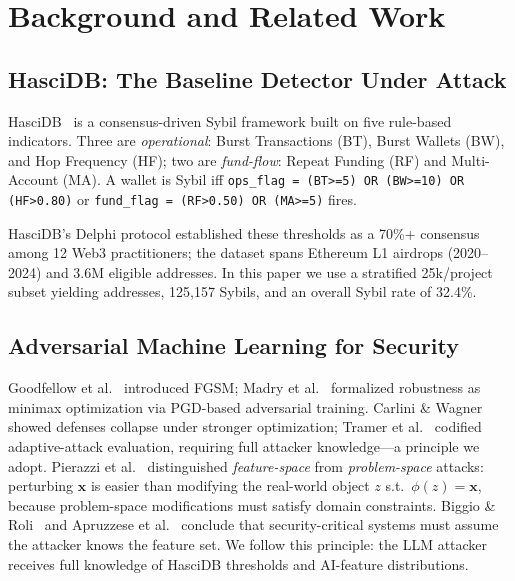 \documentclass[sigconf,nonacm=false]{acmart}
\begin{document}


\section{Background and Related Work}
\label{sec:background}

\subsection{HasciDB: The Baseline Detector Under Attack}

HasciDB~\cite{hascidb2026} is a consensus-driven Sybil framework built on five rule-based indicators. Three are \textit{operational}: Burst Transactions (BT), Burst Wallets (BW), and Hop Frequency (HF); two are \textit{fund-flow}: Repeat Funding (RF) and Multi-Account (MA). A wallet is Sybil iff \texttt{ops\_flag = (BT>=5) OR (BW>=10) OR (HF>0.80)} or \texttt{fund\_flag = (RF>0.50) OR (MA>=5)} fires.

HasciDB's Delphi protocol established these thresholds as a 70\%+ consensus among 12 Web3 practitioners; the dataset spans \largeScaleNProjects{} Ethereum L1 airdrops (2020--2024) and 3.6M eligible addresses. In this paper we use a stratified 25k/project subset yielding \largeScaleNAddresses{} addresses, 125,157 Sybils, and an overall Sybil rate of 32.4\%.

\subsection{Adversarial Machine Learning for Security}

Goodfellow et al.~\cite{goodfellow2014} introduced FGSM; Madry et al.~\cite{madry2018} formalized robustness as minimax optimization via PGD-based adversarial training.
Carlini \& Wagner~\cite{carlini2017} showed defenses collapse under stronger optimization; Tramer et al.~\cite{tramer2020} codified adaptive-attack evaluation, requiring full attacker knowledge---a principle we adopt.
Pierazzi et al.~\cite{pierazzi2020} distinguished \textit{feature-space} from \textit{problem-space} attacks: perturbing $\mathbf{x}$ is easier than modifying the real-world object $z$ s.t.\ $\phi(z) = \mathbf{x}$, because problem-space modifications must satisfy domain constraints.
Biggio \& Roli~\cite{biggio2018wild} and Apruzzese et al.~\cite{apruzzese2023} conclude that security-critical systems must assume the attacker knows the feature set. We follow this principle: the LLM attacker receives full knowledge of HasciDB thresholds and AI-feature distributions.
\end{document}
